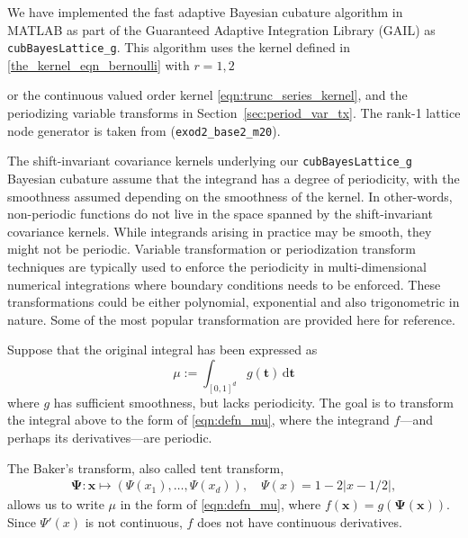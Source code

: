 \documentclass{iitthesis}          %
\newcommand{\bm}[1]{\boldsymbol{#1}}
\newcommand{\dif}[1]{\text{d}{#1}}
\newcommand{\vt}{\bm{t}}
\newcommand{\vx}{\bm{x}}
\newcommand{\vPsi}{\boldsymbol{\Psi}}
\newcommand{\code}[1]{\texttt{#1}}
\def\abs#1{\ensuremath{\left \lvert #1 \right \rvert}}
\newcommand\secref{Section~\ref}
\begin{document}
We have implemented the fast adaptive Bayesian cubature algorithm in MATLAB as part of the Guaranteed Adaptive Integration Library (GAIL) \cite{ChoEtal17b} as \allowbreak \\ \code{cubBayesLattice\_g}. This algorithm uses the kernel defined in  \eqref{the_kernel_eqn_bernoulli} with  $r=1,2$

 or the continuous valued order kernel \eqref{eqn:trunc_series_kernel}, and the periodizing variable transforms in \secref{sec:period_var_tx}. The rank-1 lattice node generator is taken from \cite{NuyMagic} (\code{exod2\_base2\_m20}).












\label{sec:period_var_tx}

The shift-invariant covariance kernels underlying our \code{cubBayesLattice\_g} \\
Bayesian cubature  assume that the integrand has a degree of periodicity, with the smoothness assumed depending on the smoothness of the kernel.  
In other-words, non-periodic functions do not live in the space spanned by the shift-invariant covariance kernels.
While integrands arising in practice may be smooth, they might not be periodic.  
Variable transformation or periodization transform techniques are typically used to enforce the periodicity in multi-dimensional numerical integrations where boundary conditions needs to be enforced. These transformations could be either polynomial, exponential and also trigonometric in nature. Some of the most popular transformation are provided here for reference. 

Suppose that the original integral has been expressed as 
\begin{equation*}
\mu := \int_{[0,1]^d} g(\vt) \, \dif \vt
\end{equation*}
where $g$ has sufficient smoothness, but lacks periodicity.  
The goal is to transform the integral above to the form of \eqref{eqn:defn_mu}, where the integrand $f$---and perhaps its derivatives---are  periodic.  

The Baker's transform, also called tent transform,
\begin{align} \label{eq:bakerTrans}
\vPsi: \vx \mapsto (\Psi(x_1),  \ldots, \Psi(x_d)),  \quad \Psi(x)  =1 - 2 \abs{x - 1/2},
\end{align}
allows us to write $\mu$ in the form of \eqref{eqn:defn_mu}, where $f(\vx) = g(\vPsi(\vx))$.  
Since  $\Psi'(x)$ is not continuous, $f$ does not have continuous derivatives. 
\end{document}
